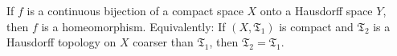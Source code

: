 If $f$ is a continuous bijection of a compact space $X$ onto a Hausdorff space $Y$, then $f$ is a homeomorphism. Equivalently: If $(X, \mathfrak{T}_1)$ is compact and $\mathfrak{T}_2$ is a Hausdorff topology on $X$ coarser than $\mathfrak{T}_1$, then $\mathfrak{T}_2 = \mathfrak{T}_1$.
